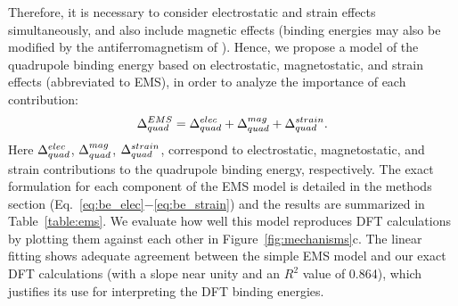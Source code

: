 Therefore, it is necessary to consider electrostatic and strain effects simultaneously, and also include magnetic effects (binding energies may also be modified by the antiferromagnetism of ).
Hence, we propose a model of the quadrupole binding energy based on electrostatic, magnetostatic, and strain effects (abbreviated to EMS), in order to analyze the importance of each contribution:
\begin{align}
    \Delta_{quad}^{EMS} = \Delta_{quad}^{elec} + \Delta_{quad}^{mag} + \Delta_{quad}^{strain}.
    \label{eq:ems}
\end{align}
Here $\Delta_{quad}^{elec}$, $\Delta_{quad}^{mag}$, $\Delta_{quad}^{strain}$, correspond to electrostatic, magnetostatic, and strain contributions to the quadrupole binding energy, respectively.
The exact formulation for each component of the EMS model is detailed in the methods section (Eq.~\ref{eq:be_elec}$-$\ref{eq:be_strain}) and the results are summarized in Table~\ref{table:ems}.
We evaluate how well this model reproduces DFT calculations by plotting them against each other in Figure~\ref{fig:mechanisms}c.
The linear fitting shows adequate agreement between the simple EMS model and our exact DFT calculations (with a slope near unity and an $R^2$ value of 0.864), which justifies its use for interpreting the DFT binding energies.

